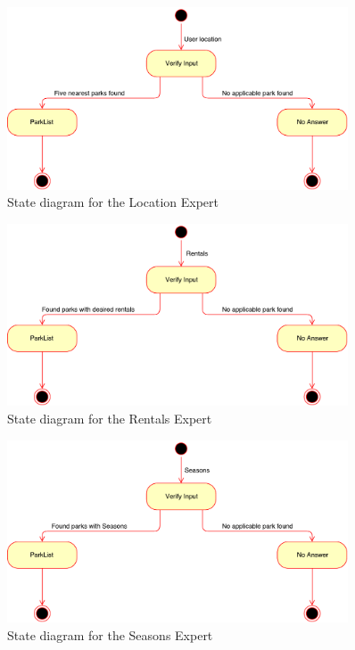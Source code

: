\documentclass[titlepage,12pt]{article}
\begin{document}
\begin{figure}[H]
    \centerline{\includegraphics[width=0.90\textwidth]{state_diagrams/Location_Expert}}
    \caption{State diagram for the Location Expert}
    \label{fig:location_expert}
\end{figure}

\begin{figure}[H]
    \centerline{\includegraphics[width=0.90\textwidth]{state_diagrams/Rentals_Expert}}
    \caption{State diagram for the Rentals Expert}
    \label{fig:rentals_expert}
\end{figure}

\begin{figure}[H]
    \centerline{\includegraphics[width=0.90\textwidth]{state_diagrams/Seasons_Expert}}
    \caption{State diagram for the Seasons Expert}
    \label{fig:seasons_expert}
\end{figure}
\end{document}
